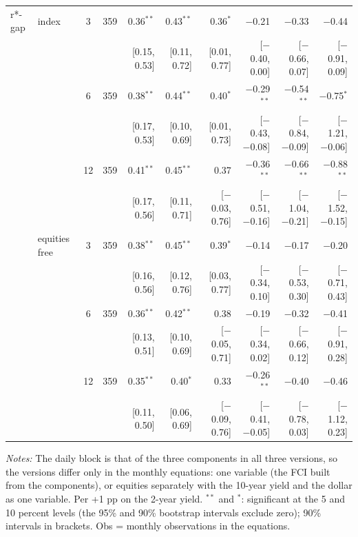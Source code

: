 \begin{longtable}{llcrrrrrrr}
\addlinespace
r*-gap & index & 3 & 359 & 0.36$^{**}$ & 0.43$^{**}$ & 0.36$^{*}$ & $-$0.21 & $-$0.33 & $-$0.44\\
 & & & & {\scriptsize [0.15, 0.53]} & {\scriptsize [0.11, 0.72]} & {\scriptsize [0.01, 0.77]} & {\scriptsize [$-$0.40, 0.00]} & {\scriptsize [$-$0.66, 0.07]} & {\scriptsize [$-$0.91, 0.09]}\\
 &  & 6 & 359 & 0.38$^{**}$ & 0.44$^{**}$ & 0.40$^{*}$ & $-$0.29$^{**}$ & $-$0.54$^{**}$ & $-$0.75$^{*}$\\
 & & & & {\scriptsize [0.17, 0.53]} & {\scriptsize [0.10, 0.69]} & {\scriptsize [0.01, 0.73]} & {\scriptsize [$-$0.43, $-$0.08]} & {\scriptsize [$-$0.84, $-$0.09]} & {\scriptsize [$-$1.21, $-$0.06]}\\
 &  & 12 & 359 & 0.41$^{**}$ & 0.45$^{**}$ & 0.37 & $-$0.36$^{**}$ & $-$0.66$^{**}$ & $-$0.88$^{**}$\\
 & & & & {\scriptsize [0.17, 0.56]} & {\scriptsize [0.11, 0.71]} & {\scriptsize [$-$0.03, 0.76]} & {\scriptsize [$-$0.51, $-$0.16]} & {\scriptsize [$-$1.04, $-$0.21]} & {\scriptsize [$-$1.52, $-$0.15]}\\
 & equities free & 3 & 359 & 0.38$^{**}$ & 0.45$^{**}$ & 0.39$^{*}$ & $-$0.14 & $-$0.17 & $-$0.20\\
 & & & & {\scriptsize [0.16, 0.56]} & {\scriptsize [0.12, 0.76]} & {\scriptsize [0.03, 0.77]} & {\scriptsize [$-$0.34, 0.10]} & {\scriptsize [$-$0.53, 0.30]} & {\scriptsize [$-$0.71, 0.43]}\\
 &  & 6 & 359 & 0.36$^{**}$ & 0.42$^{**}$ & 0.38 & $-$0.19 & $-$0.32 & $-$0.41\\
 & & & & {\scriptsize [0.13, 0.51]} & {\scriptsize [0.10, 0.69]} & {\scriptsize [$-$0.05, 0.71]} & {\scriptsize [$-$0.34, 0.02]} & {\scriptsize [$-$0.66, 0.12]} & {\scriptsize [$-$0.91, 0.28]}\\
 &  & 12 & 359 & 0.35$^{**}$ & 0.40$^{*}$ & 0.33 & $-$0.26$^{**}$ & $-$0.40 & $-$0.46\\
 & & & & {\scriptsize [0.11, 0.50]} & {\scriptsize [0.06, 0.69]} & {\scriptsize [$-$0.09, 0.76]} & {\scriptsize [$-$0.41, $-$0.05]} & {\scriptsize [$-$0.78, 0.03]} & {\scriptsize [$-$1.12, 0.23]}\\
\end{longtable}
\begin{flushleft}\footnotesize\textit{Notes:} The daily block is that of the three components in all three versions, so the versions differ only in the monthly equations: one variable (the FCI built from the components), or equities separately with the 10-year yield and the dollar as one variable. Per +1 pp on the 2-year yield. $^{**}$ and $^{*}$: significant at the 5 and 10 percent levels (the 95\% and 90\% bootstrap intervals exclude zero); 90\% intervals in brackets. Obs = monthly observations in the equations.\end{flushleft}
\endgroup
